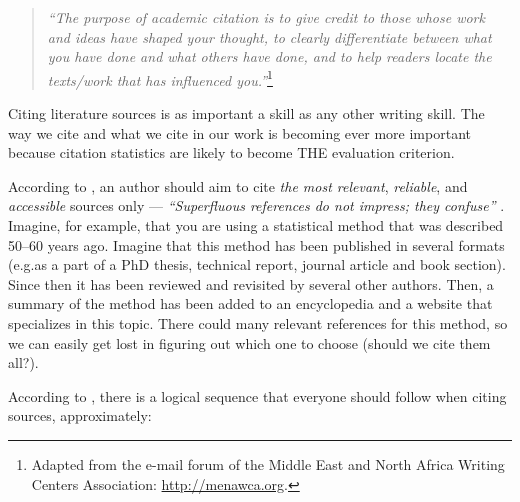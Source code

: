 \documentclass[graybox,envcountchap,sectrefs,UStrade]{svmono}
\begin{document}
\begin{quote}
\emph{``The purpose of academic citation is to give credit to those whose work and ideas have shaped your thought, to clearly differentiate between what you have done and what others have done, and to help readers locate the texts/work that has influenced you.''}\footnote{Adapted from the e-mail forum of the Middle East and North Africa Writing Centers Association: \url{http://menawca.org}.}
\end{quote}

Citing literature sources is as important a skill as any other writing skill. The way we cite and what we cite in our work is becoming ever more important because citation statistics are likely to become THE evaluation criterion.\par

According to \citet{Rossiter2010RCS}, an author should aim to cite \emph{the most relevant}, \emph{reliable}, and \emph{accessible} sources only --- \emph{``Superfluous references do not impress; they confuse''} \citep[p.32]{Rossiter2010RCS}. Imagine, for example, that you are using a statistical method that was described 50--60 years ago. Imagine that this method has been published in several formats (e.g.\@ as a part of a PhD thesis, technical report, journal article and book section). Since then it has been reviewed and revisited by several other authors. Then, a summary of the method has been added to an encyclopedia and a website that specializes in this topic. There could many relevant references for this method, so we can easily get lost in figuring out which one to choose (should we cite them all?).\par

According to \citet{Rossiter2010RCS}, there is a logical sequence that everyone should follow when citing sources, approximately:
\end{document}
